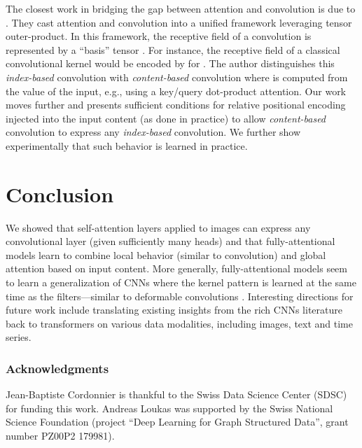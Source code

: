 \documentclass{article} \usepackage{iclr2020_conference,times}
\begin{document}
The closest work in bridging the gap between attention and convolution is due to \cite{outerproduct2019andreoli}.
They cast attention and convolution into a unified framework leveraging tensor outer-product.
In this framework, the receptive field of a convolution is represented by a ``basis'' tensor .
For instance, the receptive field of a classical  convolutional kernel would be encoded by  for .
The author distinguishes this \emph{index-based} convolution with \emph{content-based} convolution where  is computed from the value of the input, e.g., using a key/query dot-product attention.
Our work moves further and presents sufficient conditions for relative positional encoding injected into the input content (as done in practice) to allow \emph{content-based} convolution to express any \emph{index-based} convolution.
We further show experimentally that such behavior is learned in practice.





\section{Conclusion}
\label{sec:discussion}

We showed that self-attention layers applied to images can express any convolutional layer (given sufficiently many heads) and
that fully-attentional models learn to combine local behavior (similar to convolution) and global attention based on input content.
More generally, fully-attentional models seem to learn a generalization of CNNs where the kernel pattern is learned at the same time as the filters---similar to deformable convolutions \citep{dai2017deformable,Zampieri2019masterthesis}.
Interesting directions for future work include translating existing insights from the rich CNNs literature back to transformers on various data modalities, including images, text and time series.

\subsubsection*{Acknowledgments}
Jean-Baptiste Cordonnier is thankful to the Swiss Data Science Center (SDSC) for funding this work.
Andreas Loukas was supported by the Swiss National Science Foundation (project “Deep Learning for Graph Structured Data”, grant number PZ00P2 179981).

\newpage



\end{document}
